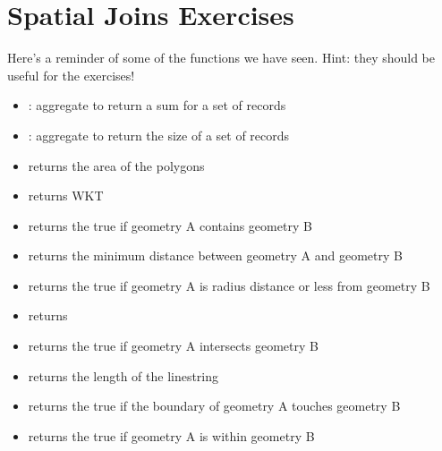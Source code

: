 \documentclass[a4paper,11pt,english]{sphinxmanual}
\begin{document}
\section{Spatial Joins Exercises}
\label{\detokenize{basic:spatial-joins-exercises}}\label{\detokenize{basic:joins-exercises}}
Here’s a reminder of some of the functions we have seen.  Hint: they should be useful for the exercises!
\begin{itemize}
\item {} 
: aggregate to return a sum for a set of records

\item {} 
: aggregate to return the size of a set of records

\item {} 
 returns the area of the polygons

\item {} 
 returns WKT 

\item {} 
 returns the true if geometry A contains geometry B

\item {} 
 returns the minimum distance between geometry A and geometry B

\item {} 
 returns the true if geometry A is radius distance or less from geometry B

\item {} 
 returns 

\item {} 
 returns the true if geometry A intersects geometry B

\item {} 
 returns the length of the linestring

\item {} 
 returns the true if the boundary of geometry A touches geometry B

\item {} 
 returns the true if geometry A is within geometry B

\end{itemize}
\end{document}
